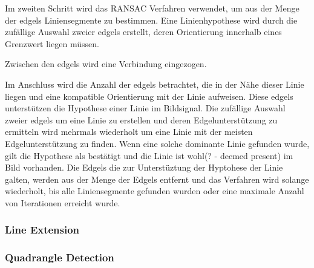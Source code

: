 Im zweiten Schritt wird das RANSAC Verfahren verwendet, um aus der Menge der \gls{edgels} Liniensegmente zu bestimmen. Eine Linienhypothese wird durch die zufällige Auswahl zweier \gls{edgels} erstellt, deren Orientierung innerhalb eines Grenzwert liegen müssen.

Zwischen den \gls{edgels} wird eine Verbindung eingezogen.

Im Anschluss wird die Anzahl der \gls{edgels} betrachtet, die in der Nähe dieser Linie liegen und eine kompatible Orientierung mit der Linie aufweisen. Diese \gls{edgels} unterstützen die Hypothese einer Linie im Bildsignal. Die zufällige Auswahl zweier \gls{edgels} um eine Linie zu erstellen und deren Edgelunterstützung zu ermitteln wird mehrmals wiederholt um eine Linie mit der meisten Edgelunterstützung zu finden. Wenn eine solche dominante Linie gefunden wurde, gilt die Hypothese als bestätigt und die Linie ist wohl(? - deemed present) im Bild vorhanden. Die Edgels die zur Unterstüztung der Hyptohese der Linie galten, werden aus der Menge der Edgels entfernt und das Verfahren wird solange wiederholt, bis alle Liniensegmente gefunden wurden oder eine maximale Anzahl von Iterationen erreicht wurde.

\subsubsection{Line Extension} %
\label{sub:line_extension}

\subsubsection{Quadrangle Detection} %
\label{sub:quadrangle_detection}


